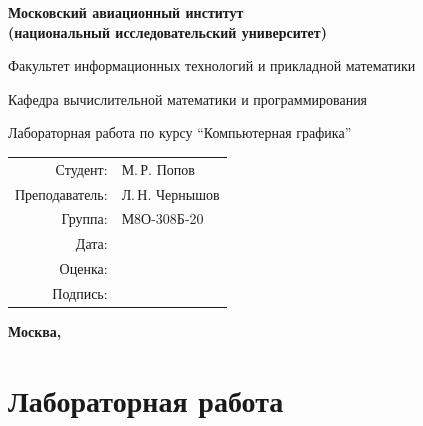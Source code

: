 \documentclass[12pt, a4paper]{article}
\begin{document}
    \begin{titlepage}

        \begin{center}

            \bfseries
            {\Large Московский авиационный институт\\ 
            (национальный исследовательский университет)}

            \vspace{48pt}
            {\large Факультет информационных технологий и прикладной 
            математики}
            
            \vspace{36pt}
            {\large Кафедра вычислительной математики и программирования}
            
            \vspace{48pt}
            Лабораторная работа  по курсу 
            \enquote{Компьютерная графика}
            
        \end{center}
        
        \vspace{72pt}
        \begin{flushright}
            \begin{tabular}{rl}
                Студент: & М.\,Р. Попов \\
                Преподаватель: & Л.\,Н. Чернышов \\
                Группа: & М8О-308Б-20 \\
                Дата: & \\
                Оценка: & \\
                Подпись: & \\
            \end{tabular}
        \end{flushright}
        
        \vfill
        
        \begin{center}
            
            \bfseries
            Москва, \the\year
        
        \end{center}

    \end{titlepage}
        
    \pagebreak

    \section*{Лабораторная работа }
\end{document}
